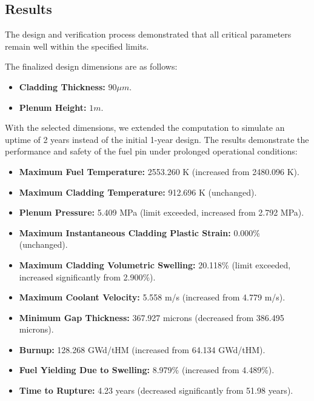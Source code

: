 \subsection{Results}

The design and verification process demonstrated that all critical parameters remain well within the specified limits.

The finalized design dimensions are as follows:
\begin{itemize}
    \item \textbf{Cladding Thickness:} $90 \mu m$.
    \item \textbf{Plenum Height:} $1 m$.
\end{itemize}

With the selected dimensions, we extended the computation to simulate an uptime of 2 years instead of the initial 1-year design. The results demonstrate the performance and safety of the fuel pin under prolonged operational conditions:

\begin{itemize}
    \item \textbf{Maximum Fuel Temperature:} 2553.260 K (increased from 2480.096 K).
    \item \textbf{Maximum Cladding Temperature:} 912.696 K (unchanged).
    \item \textbf{Plenum Pressure:} 5.409 MPa (limit exceeded, increased from 2.792 MPa).
    \item \textbf{Maximum Instantaneous Cladding Plastic Strain:} 0.000\% (unchanged).
    \item \textbf{Maximum Cladding Volumetric Swelling:} 20.118\% (limit exceeded, increased significantly from 2.900\%).
    \item \textbf{Maximum Coolant Velocity:} 5.558 m/s (increased from 4.779 m/s).
    \item \textbf{Minimum Gap Thickness:} 367.927 microns (decreased from 386.495 microns).
    \item \textbf{Burnup:} 128.268 GWd/tHM (increased from 64.134 GWd/tHM).
    \item \textbf{Fuel Yielding Due to Swelling:} 8.979\% (increased from 4.489\%).
    \item \textbf{Time to Rupture:} 4.23 years (decreased significantly from 51.98 years).
\end{itemize}

